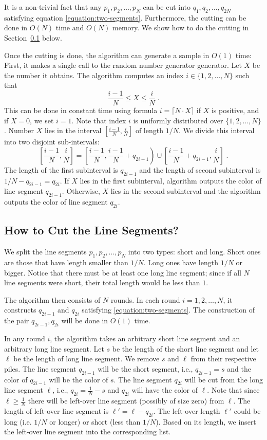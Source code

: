 \documentclass{article}
\begin{document}
It is a non-trivial fact that any $p_1, p_2, \dots, p_N$ can be cut into $q_1,
q_2, \dots, q_{2N}$ satisfying equation \eqref{equation:two-segments}.
Furthermore, the cutting can be done in $O(N)$ time and $O(N)$ memory. We show
how to do the cutting in Section~\ref{subsection:cutting} below.

Once the cutting is done, the algorithm can generate a sample in $O(1)$ time:
First, it makes a single call to the random number generator generator. Let $X$
be the number it obtains. The algorithm computes an index $i \in \{1,2,\dots,N\}$
such that
$$
\frac{i-1}{N} \le X \le \frac{i}{N} \; .
$$
This can be done in constant time using formula $i = \lceil N \cdot X \rceil$
if $X$ is positive, and if $X = 0$, we set $i=1$.  Note that index $i$ is
uniformly distributed over $\{1,2,\dots,N\}$.  Number $X$ lies in the interval
$[\frac{i-1}{N}, \frac{i}{N}]$ of length $1/N$. We divide this interval into
two disjoint sub-intervals:
$$
\left[\frac{i-1}{N}, \frac{i}{N} \right]
=
\left[\frac{i-1}{N}, \frac{i-1}{N} + q_{2i-1} \right)
\cup
\left[\frac{i-1}{N} + q_{2i-1}, \frac{i}{N} \right] \; .
$$
The length of the first subinterval is $q_{2i-1}$ and the length of second
subinterval is $1/N - q_{2i - 1} = q_{2i}$. If $X$ lies in the first
subinterval, algorithm outputs the color of line segment $q_{2i-1}$. Otherwise,
$X$ lies in the second subinterval and the algorithm outputs the color of
line segment $q_{2i}$.

\subsection{How to Cut the Line Segments?}
\label{subsection:cutting}

We split the line segments $p_1, p_2, \dots, p_N$ into two types: short and
long. Short ones are those that have length smaller than $1/N$. Long ones have
length $1/N$ or bigger. Notice that there must be at least one long line
segment; since if all $N$ line segments were short, their total length
would be less than $1$.


The algorithm then consists of $N$ rounds. In each round $i=1,2,\dots,N$, it
constructs $q_{2i-1}$ and $q_{2i}$ satisfying \eqref{equation:two-segments}.
The construction of the pair $q_{2i-1}, q_{2i}$ will be done in $O(1)$ time.

In any round $i$, the algorithm takes an arbitrary short line segment and an
arbitrary long line segment. Let $s$ be the length of the short line segment
and let $\ell$ be the length of long line segment. We remove $s$ and $\ell$
from their respective piles. The line segment $q_{2i-1}$ will be the short
segment, i.e., $q_{2i-1} = s$ and the color of $q_{2i-1}$ will be the color of
$s$.  The line segment $q_{2i}$ will be cut from the long line segment $\ell$,
i.e., $q_{2i} = \frac{1}{N} - s$ and $q_{2i}$ will have the color of $\ell$.
Note that since $\ell \ge \frac{1}{N}$ there will be left-over line segment
(possibly of size zero) from $\ell$. The length of left-over line segment is
$\ell' = \ell - q_{2i}$. The left-over length $\ell'$ could be long (i.e. $1/N$
or longer) or short (less than $1/N$). Based on its length, we insert the
left-over line segment into the corresponding list.
\end{document}
